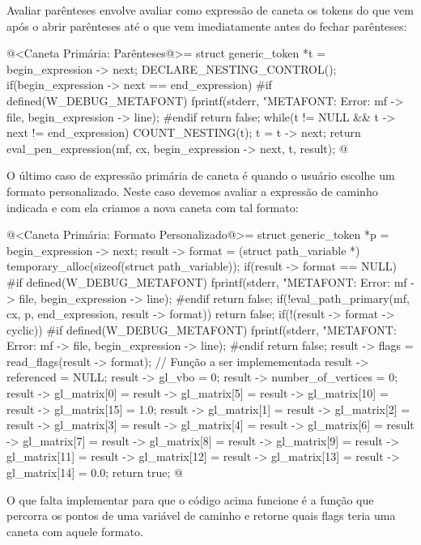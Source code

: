 {Avaliar parênteses envolve avaliar como expressão de caneta os tokens
do que vem após o abrir parênteses até o que vem imediatamente antes
do fechar parênteses:

\iniciocodigo
@<Caneta Primária: Parênteses@>=
struct generic_token *t = begin_expression -> next;
DECLARE_NESTING_CONTROL();
if(begin_expression -> next == end_expression){
#if defined(W_DEBUG_METAFONT)
  fprintf(stderr, "METAFONT: Error: %
          mf -> file, begin_expression -> line);
#endif
  return false;
}
while(t != NULL && t -> next != end_expression){
  COUNT_NESTING(t);
  t = t -> next;
}
return eval_pen_expression(mf, cx, begin_expression -> next, t, result);
@
\fimcodigo

O último caso de expressão primária de caneta é quando o usuário
escolhe um formato personalizado. Neste caso devemos avaliar a
expressão de caminho indicada e com ela criamos a nova caneta com tal
formato:

\iniciocodigo
@<Caneta Primária: Formato Personalizado@>=
struct generic_token *p = begin_expression -> next;
result -> format =
        (struct path_variable *) temporary_alloc(sizeof(struct path_variable));
if(result -> format == NULL){
#if defined(W_DEBUG_METAFONT)
  fprintf(stderr, "METAFONT: Error: %
          mf -> file, begin_expression -> line);
#endif
  return false;
}
if(!eval_path_primary(mf, cx, p, end_expression, result -> format))
  return false;
if(!(result -> format -> cyclic)){
#if defined(W_DEBUG_METAFONT)
  fprintf(stderr,
          "METAFONT: Error: %
          mf -> file, begin_expression -> line);
#endif
  return false;
}
result -> flags = read_flags(result -> format); // Função a ser implemementada
result -> referenced = NULL;
result -> gl_vbo = 0;
result -> number_of_vertices = 0;
result -> gl_matrix[0] = result -> gl_matrix[5] = result -> gl_matrix[10] =
                         result -> gl_matrix[15] = 1.0; 
result -> gl_matrix[1] = result -> gl_matrix[2] = result -> gl_matrix[3] = 
                         result -> gl_matrix[4] = result -> gl_matrix[6] =
                         result -> gl_matrix[7] = result -> gl_matrix[8] = 
                         result -> gl_matrix[9] = result -> gl_matrix[11] =
                         result -> gl_matrix[12] = result -> gl_matrix[13] =
                         result -> gl_matrix[14] = 0.0;
return true;
@
\fimcodigo

O que falta implementar para que o código acima funcione é a função
que percorra os pontos de uma variável de caminho e retorne quais
flags teria uma caneta com aquele formato.

}
